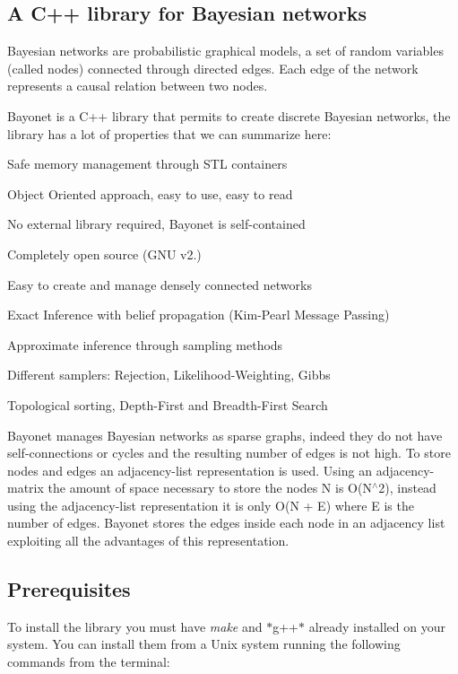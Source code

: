 \subsection*{A C++ library for Bayesian networks }

Bayesian networks are probabilistic graphical models, a set of random variables (called nodes) connected through directed edges. Each edge of the network represents a causal relation between two nodes.

Bayonet is a C++ library that permits to create discrete Bayesian networks, the library has a lot of properties that we can summarize here\-:


\begin{DoxyItemize}
\item Safe memory management through S\-T\-L containers
\item Object Oriented approach, easy to use, easy to read
\item No external library required, Bayonet is self-\/contained
\item Completely open source (G\-N\-U v2.)
\item Easy to create and manage densely connected networks
\item Exact Inference with belief propagation (Kim-\/\-Pearl Message Passing)
\item Approximate inference through sampling methods
\item Different samplers\-: Rejection, Likelihood-\/\-Weighting, Gibbs
\item Topological sorting, Depth-\/\-First and Breadth-\/\-First Search
\end{DoxyItemize}

Bayonet manages Bayesian networks as sparse graphs, indeed they do not have self-\/connections or cycles and the resulting number of edges is not high. To store nodes and edges an adjacency-\/list representation is used. Using an adjacency-\/matrix the amount of space necessary to store the nodes N is O(\-N$^\wedge$2), instead using the adjacency-\/list representation it is only O(N + E) where E is the number of edges. Bayonet stores the edges inside each node in an adjacency list exploiting all the advantages of this representation.

\subsection*{Prerequisites }

To install the library you must have {\itshape make} and $\ast$g++$\ast$ already installed on your system. You can install them from a Unix system running the following commands from the terminal\-:

